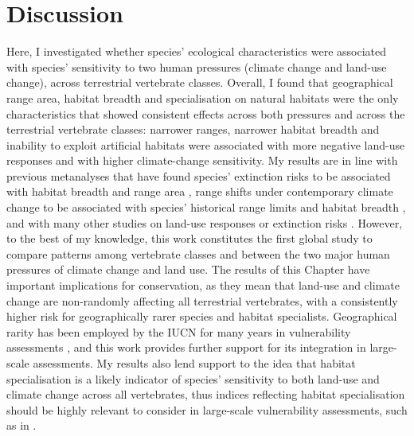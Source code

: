 \clearpage

\section{Discussion}
Here, I investigated whether species' ecological characteristics were associated with species' sensitivity to two human pressures (climate change and land-use change), across terrestrial vertebrate classes. Overall, I found that geographical range area, habitat breadth and specialisation on natural habitats were the only characteristics that showed consistent effects across both pressures and across the terrestrial vertebrate classes: narrower ranges, narrower habitat breadth and inability to exploit artificial habitats were associated with more negative land-use responses and with higher climate-change sensitivity. My results are in line with previous metanalyses that have found species' extinction risks to be associated with habitat breadth and range area \citep{Chichorro2019}, range shifts under contemporary climate change to be associated with species' historical range limits and habitat breadth \citep{MacLean2017}, and with many other studies on land-use responses or extinction risks \citep{Ripple2017, Newbold2018a, Nowakowski2017}. However, to the best of my knowledge, this work constitutes the first global study to compare patterns among vertebrate classes and between the two major human pressures of climate change and land use. The results of this Chapter have important implications for conservation, as they mean that land-use and climate change are non-randomly affecting all terrestrial vertebrates, with a consistently higher risk for geographically rarer species and habitat specialists. Geographical rarity has been employed by the IUCN for many years in vulnerability assessments \citep{Rodrigues2006}, and this work provides further support for its integration in large-scale assessments. My results also lend support to the idea that habitat specialisation is a likely indicator of species' sensitivity to both land-use and climate change across all vertebrates, thus indices reflecting habitat specialisation should be highly relevant to consider in large-scale vulnerability assessments, such as in \citet{Foden2013}. 

